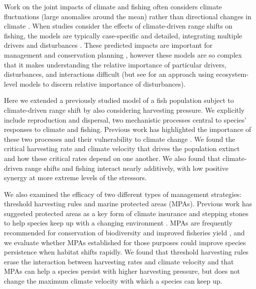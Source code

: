 \documentclass[12pt,english]{article}
\begin{document}
\begin{spacing}{1.9}
\begin{flushleft}
Work on the joint impacts of climate and fishing often considers climate fluctuations (large anomalies around the mean) rather than directional changes in climate \citep{WaltersParma1996, KingMcFarlane2006}. When studies consider the effects of climate-driven range shifts on fishing, the models are typically case-specific and detailed, integrating multiple drivers and disturbances \citep{Cheungetal2010, Lindegrenetal2010, Brownetal2010, Merinoetal2010, Merinoetal2010b, Plaganyietal2011, Ainsworthetal2011, Zhangetal2011, Barangeetal2011, Howardetal2013}. These predicted impacts are important for management and conservation planning \citep{Allisonetal2009}, however these models are so complex that it makes understanding the relative importance of particular drivers, disturbances, and interactions difficult (but see \citet{Nyeetal2013} for an approach using ecosystem-level models to discern relative importance of disturbances).

Here we extended a previously studied model of a fish population subject to climate-driven range shift by also considering harvesting pressure. We explicitly include reproduction and dispersal, two mechanistic processes central to species' responses to climate and fishing. Previous work has highlighted the importance of these two processes and their vulnerability to climate change \citep{Fordhametal2013, Hastingsetal2005}.  We found the critical harvesting rate and climate velocity that drives the population extinct and how these critical rates depend on one another.   We also found that climate-driven range shifts and fishing interact nearly additively, with low positive synergy at more extreme levels of the stressors.  

We also examined the efficacy of two different types of management strategies: threshold harvesting rules and marine protected areas (MPAs). Previous work has suggested protected areas as a key form of climate insurance and stepping stones to help species keep up with a changing environment \citep{Thomasetal2012, Hannahetal2007}. MPAs are frequently recommended for conservation of biodiversity and improved fisheries yield \citep{Gainesetal2010}, and we evaluate whether MPAs established for those purposes could improve species persistence when habitat shifts rapidly. We found that threshold harvesting rules erase the interaction between harvesting rates and climate velocity and that MPAs can help a species persist with higher harvesting pressure, but does not change the maximum climate velocity with which a species can keep up.


\end{flushleft}
\end{spacing}
\end{document}
